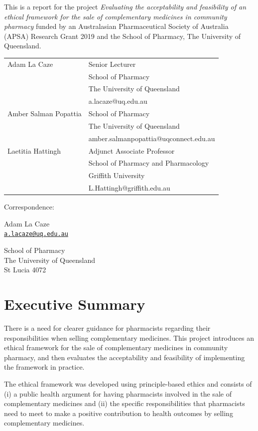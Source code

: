 \documentclass[12pt,]{article}
\author{}
\date{\vspace{-2.5em}}
\begin{document}


This is a report for the project \emph{Evaluating the acceptability and
feasibility of an ethical framework for the sale of complementary
medicines in community pharmacy} funded by an Australasian
Pharmaceutical Society of Australia (APSA) Research Grant 2019 and the
School of Pharmacy, The University of Queensland.

\bigskip

\bigskip

\begin{tabular}{ll} Adam La Caze & Senior Lecturer\tabularnewline
& School of Pharmacy\tabularnewline
& The University of Queensland\tabularnewline
& a.lacaze@uq.edu.au\tabularnewline[10pt] Amber Salman Popattia & School of Pharmacy\tabularnewline
& The University of Queensland\tabularnewline
& amber.salmanpopattia@uqconnect.edu.au\tabularnewline[10pt] Laetitia Hattingh & Adjunct Associate Professor\tabularnewline
& School of Pharmacy and Pharmacology\tabularnewline
& Griffith University\tabularnewline
& L.Hattingh@griffith.edu.au\tabularnewline
\end{tabular}

\bigskip

Correspondence:

Adam La Caze\\
\href{mailto:a.lacaze@uq.edu.au}{\nolinkurl{a.lacaze@uq.edu.au}}

School of Pharmacy\\
The University of Queensland\\
St Lucia 4072

\newpage

\section*{Executive Summary}\label{executive-summary}

There is a need for clearer guidance for pharmacists regarding their
responsibilities when selling complementary medicines. This project
introduces an ethical framework for the sale of complementary medicines
in community pharmacy, and then evaluates the acceptability and
feasibility of implementing the framework in practice.

The ethical framework was developed using principle-based ethics and
consists of (i) a public health argument for having pharmacists involved
in the sale of complementary medicines and (ii) the specific
responsibilities that pharmacists need to meet to make a positive
contribution to health outcomes by selling complementary medicines.
\end{document}
